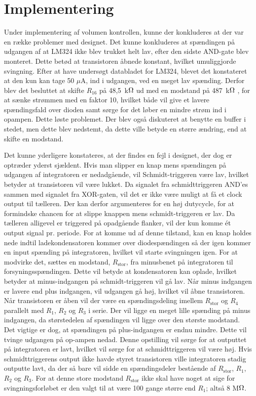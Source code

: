 \section{Implementering}
Under implementering af volumen kontrollen, kunne der konkluderes at der var en række problemer med designet. Det kunne konkluderes at spændingen på udgangen af at LM324 ikke blev trukket helt lav, efter den sidste AND-gate blev monteret. Dette betød at transistoren åbnede konstant, hvilket umuliggjorde svingning. Efter at have undersøgt databladet for LM324, blevet det konstateret at den kun kan tage 50 $\mu$A, ind i udgangen, ved en meget lav spænding. Derfor blev det besluttet at skifte $R_{16}$ på 48,5~k$\ohm$ ud med en modstand på 487~k$\ohm$ , for at sænke strømmen med en faktor 10, hvilket både vil give et lavere spændingsfald over dioden samt sørge for det løber en mindre strøm ind i opampen. Dette løste problemet. Der blev også diskuteret at benytte en buffer i stedet, men dette blev nedstemt, da dette ville betyde en større ændring, end at skifte en modstand.

Det kunne yderligere konstateres, at der findes en fejl i designet, der dog er optræder yderst sjældent. Hvis man slipper en knap mens spændingen på udgangen af integratoren er nedadgående, vil Schmidt-triggeren være lav, hvilket betyder at transistoren vil være lukket. Da signalet fra schmidttriggeren AND'es sammen med signalet fra XOR-gaten, vil det er ikke være muligt at få et clock output til tælleren. Der kan derfor argumenteres for en høj dutycycle, for at formindske chancen for at slippe knappen mens schmidt-triggeren er lav. Da tælleren alligevel er triggered på opadgående flanker, vil der kun komme ét output signal pr. periode. For at komme ud af denne tilstand, kan en knap holdes nede indtil ladekondensatoren kommer over diodespændingen så der igen kommer en input spænding på integratoren, hvilket vil starte svingningen igen. 
For at modvirke det, sættes en modstand, $R_{\mathrm{stor}}$, fra minusbenet på integratoren til forsyningsspændingen. Dette vil betyde at kondensatoren kan oplade, hvilket betyder at minus-indgangen på schmidt-triggeren vil gå lav. Når minus indgangen er lavere end plus indgangen, vil udgangen gå høj, hvilket vil åbne transistoren. Når transistoren er åben vil der være en spændingsdeling imellem $R_{\mathrm{stor}}$ og $R_4$ parallelt med $R_1$, $R_2$ og $R_3$ i serie. Der vil ligge en meget lille spænding på minus indgangen, da størstedelen af spændingen vil ligge over den største modstand. Det vigtige er dog, at spændingen på plus-indgangen er endnu mindre. Dette vil tvinge udgangen på op-ampen nedad. Denne opstilling vil sørge for at outputtet på integratoren er lavt, hvilket vil sørge for at schmidttriggeren vil være høj. Hvis schmidttriggerens output ikke havde styret transistoren ville integratoren stadig outputte lavt, da der så bare vil sidde en spændingsdeler bestående af $R_{\mathrm{stor}}$, $R_1$, $R_2$ og $R_3$.
For at denne store modstand $R_{\mathrm{stor}}$ ikke skal have noget at sige for svingningsforløbet er den valgt til at være 100 gange større end $R_1$; altså 8 M$\ohm$.